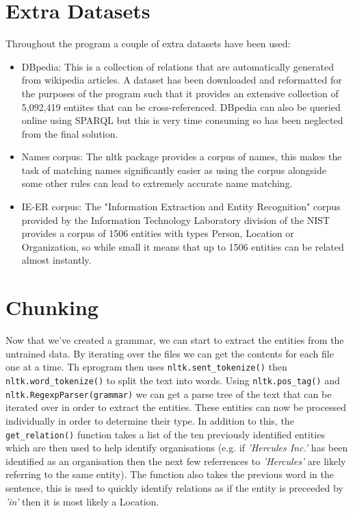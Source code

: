 \documentclass[draft]{article}
\begin{document}
\begin{multicols*}{2}
\section*{Extra Datasets}
Throughout the program a couple of extra datasets have been used:
\begin{itemize}
\item DBpedia: This is a collection of relations that are automatically generated from wikipedia articles. A dataset has been downloaded and reformatted for the purposes of the program such that it provides an extensive collection of 5,092,419 entiites that can be cross-referenced. DBpedia can also be queried online using SPARQL but this is very time consuming so has been neglected from the final solution.
\item Names corpus: The nltk package provides a corpus of names, this makes the task of matching names significantly easier as using the corpus alongside some other rules can lead to extremely accurate name matching.
\item IE-ER corpus: The "Information Extraction and Entity Recognition" corpus provided by the Information Technology Laboratory division of the NIST provides a corpus of 1506 entities with types Person, Location or Organization, so while small it means that up to 1506 entities can be related almost instantly.
\end{itemize}

\section*{Chunking}
Now that we've created a grammar, we can start to extract the entities from the untrained data. By iterating over the files we can get the contents for each file one at a time. Th eprogram then uses \texttt{nltk.sent\_tokenize()} then \texttt{nltk.word\_tokenize()} to split the text into words. Using \texttt{nltk.pos\_tag()} and \texttt{nltk.RegexpParser(grammar)} we can get a parse tree of the text that can be iterated over in order to extract the entities. These entities can now be processed individually in order to determine their type. In addition to this, the \texttt{get\_relation()} function takes a list of the ten previously identified entities which are then used to help identify organisations (e.g. if \textit{'Hercules Inc.'} has been identified as an organisation then the next few referrences to \textit{'Hercules'} are likely referring to the same entity). The function also takes the previous word in the sentence, this is used to quickly identify relations as if the entity is preceeded by \textit{'in'} then it is most likely a Location.


\end{multicols*}
\end{document}
